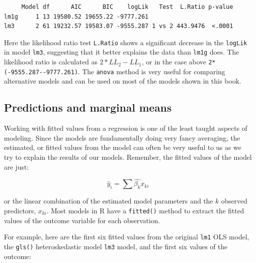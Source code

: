 \documentclass[
  letterpaper,
  DIV=11,
  numbers=noendperiod]{scrreprt}
\newenvironment{Shaded}{\begin{snugshade}}{\end{snugshade}}
\newcommand{\AttributeTok}[1]{\textcolor[rgb]{0.40,0.45,0.13}{#1}}
\newcommand{\FunctionTok}[1]{\textcolor[rgb]{0.28,0.35,0.67}{#1}}
\newcommand{\NormalTok}[1]{\textcolor[rgb]{0.00,0.23,0.31}{#1}}
\newcommand{\OtherTok}[1]{\textcolor[rgb]{0.00,0.23,0.31}{#1}}
\newcommand{\SpecialCharTok}[1]{\textcolor[rgb]{0.37,0.37,0.37}{#1}}
\begin{document}
\begin{verbatim}
     Model df      AIC      BIC    logLik   Test  L.Ratio p-value
lm1g     1 13 19580.52 19655.22 -9777.261                        
lm3      2 61 19232.57 19583.07 -9555.287 1 vs 2 443.9476  <.0001
\end{verbatim}

Here the likelihood ratio test \texttt{L.Ratio} shows a significant
decrease in the \texttt{logLik} in model \texttt{lm3}, suggesting that
it better explains the data than \texttt{lm1g} does. The likelihood
ratio is calculated as \(2*LL_2 - LL_1\), or in the case above
\texttt{2*(-9555.287-\/-9777.261)}. The \texttt{anova} method is very
useful for comparing alternative models and can be used on most of the
models shown in this book.

\hypertarget{predictions-and-marginal-means}{%
\subsection{Predictions and marginal
means}\label{predictions-and-marginal-means}}

Working with fitted values from a regression is one of the least taught
aspects of modeling. Since the models are fundamentally doing very fancy
averaging, the estimated, or fitted values from the model can often be
very useful to us as we try to explain the results of our models.
Remember, the fitted values of the model are just:

\[
\hat{y}_i = \sum \hat{\beta_k} x_{ki}
\]

or the linear combination of the estimated model parameters and the
\(k\) observed predictors, \(x_{ki}\). Most models in R have a
\texttt{fitted()} method to extract the fitted values of the outcome
variable for each observation.

For example, here are the first six fitted values from the original
\texttt{lm1} OLS model, the \texttt{gls()} heteroskedastic model
\texttt{lm3} model, and the first six values of the outcome:

\begin{Shaded}
\end{Shaded}
\end{document}
